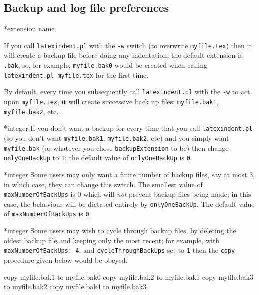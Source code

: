 
\subsection{Backup and log file preferences}
*{extension name}

 If you call \texttt{latexindent.pl} with the \texttt{-w} switch (to overwrite
 \texttt{myfile.tex}) then it will create a backup file before doing any indentation; the
 default extension is \texttt{.bak}, so, for example, \texttt{myfile.bak0} would be
 created when calling \texttt{latexindent.pl myfile.tex} for the first time.

 By default, every time you subsequently call \texttt{latexindent.pl} with the
 \texttt{-w} to act upon \texttt{myfile.tex}, it will create successive back up files:
 \texttt{myfile.bak1}, \texttt{myfile.bak2}, etc.

*{integer}
 \label{page:onlyonebackup}
 If you don't want a backup for every time that you call \texttt{latexindent.pl} (so you
 don't want \texttt{myfile.bak1}, \texttt{myfile.bak2}, etc) and you simply want
 \texttt{myfile.bak} (or whatever you chose \texttt{backupExtension} to be) then change
 \texttt{onlyOneBackUp} to \texttt{1}; the default value of \texttt{onlyOneBackUp} is
 \texttt{0}.

*{integer}
 Some users may only want a finite number of backup files, say at most $3$, in which
 case, they can change this switch. The smallest value of \texttt{maxNumberOfBackUps} is
 $0$ which will \emph{not} prevent backup files being made; in this case, the behaviour
 will be dictated entirely by \texttt{onlyOneBackUp}. The default value of
 \texttt{maxNumberOfBackUps} is \texttt{0}.

*{integer}
 Some users may wish to cycle through backup files, by deleting the oldest backup file and
 keeping only the most recent; for example, with \texttt{maxNumberOfBackUps: 4}, and
 \texttt{cycleThroughBackUps} set to \texttt{1} then the \texttt{copy} procedure given
 below would be obeyed.

 \begin{commandshell}
copy myfile.bak1 to myfile.bak0
copy myfile.bak2 to myfile.bak1
copy myfile.bak3 to myfile.bak2
copy myfile.bak4 to myfile.bak3
\end{commandshell}

